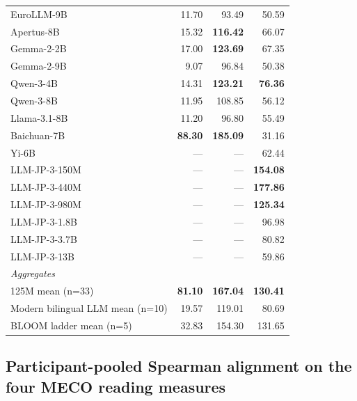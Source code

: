 \begin{table}[!ht]
\begin{tabular}{lrrr}
    EuroLLM-9B            & 11.70 & 93.49 & 50.59 \\
    Apertus-8B            & 15.32 & \textbf{116.42} & 66.07 \\
    Gemma-2-2B            & 17.00 & \textbf{123.69} & 67.35 \\
    Gemma-2-9B            & 9.07 & 96.84 & 50.38 \\
    Qwen-3-4B             & 14.31 & \textbf{123.21} & \textbf{76.36} \\
    Qwen-3-8B             & 11.95 & 108.85 & 56.12 \\
    Llama-3.1-8B          & 11.20 & 96.80 & 55.49 \\
    Baichuan-7B           & \textbf{88.30} & \textbf{185.09} & 31.16 \\
    Yi-6B                 & --- & --- & 62.44 \\
    LLM-JP-3-150M         & --- & --- & \textbf{154.08} \\
    LLM-JP-3-440M         & --- & --- & \textbf{177.86} \\
    LLM-JP-3-980M         & --- & --- & \textbf{125.34} \\
    LLM-JP-3-1.8B         & --- & --- & 96.98 \\
    LLM-JP-3-3.7B         & --- & --- & 80.82 \\
    LLM-JP-3-13B          & --- & --- & 59.86 \\
    \midrule
    \multicolumn{4}{l}{\textit{Aggregates}} \\
    \midrule
    \beetle{} 125M mean (n=33)        & \textbf{81.10} & \textbf{167.04} & \textbf{130.41} \\
    Modern bilingual LLM mean (n=10)  & 19.57 & 119.01 & 80.69 \\
    BLOOM ladder mean (n=5)           & 32.83 & 154.30 & 131.65 \\
    \bottomrule
  \end{tabular}
\end{table}

\subsection{Participant-pooled Spearman alignment on the four MECO reading measures}\label{sec:meco-english-l2-spearman}

